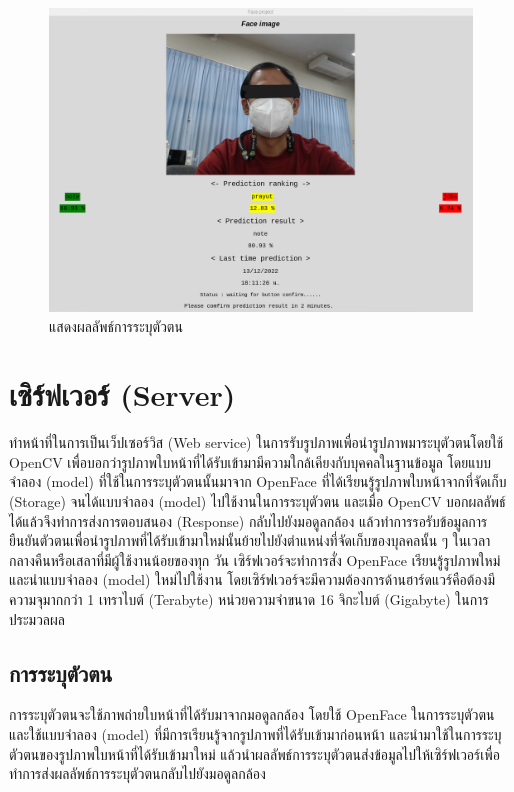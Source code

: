 \begin{figure}[!ht]
  \begin{center}
    \includegraphics[scale=.45]{pic/result_page_blind.png}
  \caption[แสดงผลลัพธ์การระบุตัวตน]{แสดงผลลัพธ์การระบุตัวตน}
  \end{center}
  \label{fig:predict_result}
\end{figure}


\section{เซิร์ฟเวอร์ (Server)}
ทำหน้าที่ในการเป็นเว็ปเซอร์วิส (Web service) ในการรับรูปภาพเพื่อนำรูปภาพมาระบุตัวตนโดยใช้ OpenCV
เพื่อบอกว่ารูปภาพใบหน้าที่ได้รับเข้ามามีความใกล้เคียงกับบุคคลในฐานข้อมูล โดยแบบจำลอง (model) ที่ใช้ในการระบุตัวตนนั้นมาจาก OpenFace ที่ได้เรียนรู้รูปภาพใบหน้าจากที่จัดเก็บ (Storage) 
จนได้แบบจำลอง (model) ไปใช้งานในการระบุตัวตน และเมื่อ OpenCV บอกผลลัพธ์ได้แล้วจึงทำการส่งการตอบสนอง (Response) 
กลับไปยังมอดูลกล้อง แล้วทำการรอรับข้อมูลการยืนยันตัวตนเพื่อนำรูปภาพที่ได้รับเข้ามาใหม่นั้นย้ายไปยังตำแหน่งที่จัดเก็บของบุลคลนั้น ๆ ในเวลากลางคืนหรือเสลาที่มีผู้ใช้งานน้อยของทุก 
วัน เซิร์ฟเวอร์จะทำการสั่ง OpenFace เรียนรู้รูปภาพใหม่ และนำแบบจำลอง (model) ใหม่ไปใช้งาน โดยเซิร์ฟเวอร์จะมีความต้องการด้านฮาร์ดแวร์คือต้องมีความจุมากกว่า 1 เทราไบต์  (Terabyte) 
หน่วยความจำขนาด 16 จิกะไบต์ (Gigabyte) ในการประมวลผล

\subsection{การระบุตัวตน}
การระบุตัวตนจะใช้ภาพถ่ายใบหน้าที่ได้รับมาจากมอดูลกล้อง โดยใช้ OpenFace ในการระบุตัวตน และใช้แบบจำลอง (model) ที่มีการเรียนรู้จากรูปภาพที่ได้รับเข้ามาก่อนหน้า 
และนำมาใช้ในการระบุตัวตนของรูปภาพใบหน้าที่ได้รับเข้ามาใหม่ แล้วนำผลลัพธ์การระบุตัวตนส่งข้อมูลไปให้เซิร์ฟเวอร์เพื่อทำการส่งผลลัพธ์การระบุตัวตนกลับไปยังมอดูลกล้อง

